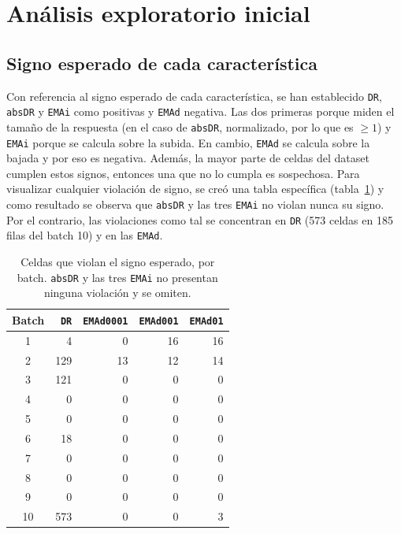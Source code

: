 \section{Análisis exploratorio inicial}
\label{sec:exploratorio}

\subsection{Signo esperado de cada característica}

Con referencia al signo esperado de cada característica, se han establecido \texttt{DR},
\texttt{absDR} y \texttt{EMAi} como positivas y \texttt{EMAd} negativa. Las dos primeras porque
miden el tamaño de la respuesta (en el caso de \texttt{absDR}, normalizado, por lo que es
$\geq 1$) y \texttt{EMAi} porque se calcula sobre la subida. En cambio, \texttt{EMAd} se calcula
sobre la bajada y por eso es negativa. Además, la mayor parte de celdas del dataset cumplen estos
signos, entonces una que no lo cumpla es sospechosa. Para visualizar cualquier violación de signo,
se creó una tabla específica (tabla~\ref{tab:violaciones}) y como resultado se observa que
\texttt{absDR} y las tres \texttt{EMAi} no violan nunca su signo. Por el contrario, las violaciones
como tal se concentran en \texttt{DR} (573 celdas en 185 filas del batch 10) y en las \texttt{EMAd}.

\begin{table}[H]
\centering
\caption{Celdas que violan el signo esperado, por batch. \texttt{absDR} y las tres \texttt{EMAi}
no presentan ninguna violación y se omiten.}
\label{tab:violaciones}
\begin{tabular}{crrrr}
\toprule
Batch & \texttt{DR} & \texttt{EMAd0001} & \texttt{EMAd001} & \texttt{EMAd01} \\
\midrule
1  & 4   & 0  & 16 & 16 \\
2  & 129 & 13 & 12 & 14 \\
3  & 121 & 0  & 0  & 0  \\
4  & 0   & 0  & 0  & 0  \\
5  & 0   & 0  & 0  & 0  \\
6  & 18  & 0  & 0  & 0  \\
7  & 0   & 0  & 0  & 0  \\
8  & 0   & 0  & 0  & 0  \\
9  & 0   & 0  & 0  & 0  \\
10 & 573 & 0  & 0  & 3  \\
\bottomrule
\end{tabular}
\end{table}

